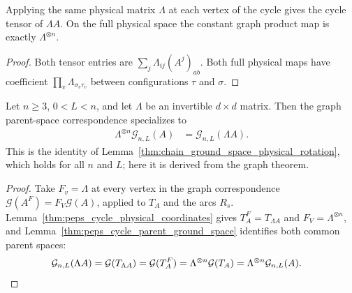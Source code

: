\begin{lemma}
    \label{thm:peps_cycle_physical_coordinates}
    \leanok
    Applying the same physical matrix $\Lambda$ at each vertex of the
    cycle gives the cycle tensor of $\Lambda A$. On the full physical
    space the constant graph product map is exactly $\Lambda^{\otimes n}$.
\end{lemma}

\begin{proof}\leanok
    Both tensor entries are
    $\sum_j\Lambda_{ij}(A^j)_{ab}$. Both full physical maps have
    coefficient $\prod_v\Lambda_{\sigma_v\tau_v}$ between
    configurations $\tau$ and $\sigma$.
\end{proof}

\begin{lemma}
    \label{thm:peps_cycle_physical_parent_specialization}
    \leanok
    Let $n\ge3$, $0<L<n$, and let $\Lambda$ be an invertible
    $d\times d$ matrix. Then the graph parent-space correspondence
    specializes to
    \begin{align}
        \Lambda^{\otimes n}\mathcal G_{n,L}(A)
         & =\mathcal G_{n,L}(\Lambda A).
    \end{align}
    This is the identity of
    Lemma~\ref{thm:chain_ground_space_physical_rotation}, which holds
    for all $n$ and $L$; here it is derived from the graph theorem.
\end{lemma}

\begin{proof}\leanok
    Take $F_v=\Lambda$ at every vertex in the graph correspondence
    $\mathcal G(A^F)=F_V\mathcal G(A)$, applied to $T_A$ and the arcs
    $R_s$. Lemma~\ref{thm:peps_cycle_physical_coordinates} gives
    $T_A^F=T_{\Lambda A}$ and $F_V=\Lambda^{\otimes n}$, and
    Lemma~\ref{thm:peps_cycle_parent_ground_space} identifies both
    common parent spaces:
    \begin{align}
        \mathcal G_{n,L}(\Lambda A)
         & =\mathcal G(T_{\Lambda A})
        =\mathcal G(T_A^F)
        =\Lambda^{\otimes n}\mathcal G(T_A)
        =\Lambda^{\otimes n}\mathcal G_{n,L}(A).
        \notag
    \end{align}
\end{proof}
